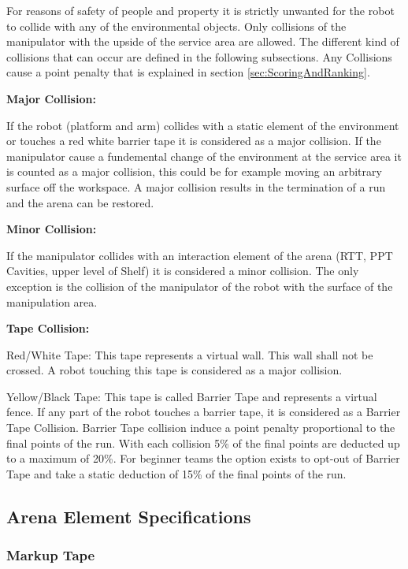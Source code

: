 For reasons of safety of people and property it is strictly unwanted for the robot to collide
with any of the environmental objects. Only collisions of the manipulator with the upside of
the service area are allowed. The different kind of collisions that can occur are defined in the
following subsections. Any Collisions cause a point penalty that is explained in section \ref{sec:ScoringAndRanking}. 

\textbf{Major Collision:}

If the robot (platform and arm) collides with a static element of the environment or touches a red white barrier tape it is considered as a major collision. If the manipulator cause a fundemental change of the environment at the service area it is counted as a major collision, this could be for example moving an arbitrary surface off the workspace. A major collision results in the termination of a run and the arena can be restored. 

\textbf{Minor Collision:}

If the manipulator collides with an interaction element of the arena (RTT, PPT Cavities, upper level
of Shelf) it is considered a minor collision. The only exception is the collision of the manipulator
of the robot with the surface of the manipulation area.

\textbf{Tape Collision:}

Red/White Tape: 
This tape represents a virtual wall. This wall shall not be crossed. A robot touching this tape is considered as a major collision.

Yellow/Black Tape: 
This tape is called Barrier Tape and represents a virtual fence. If any
part of the robot touches a barrier tape, it is considered as a Barrier Tape Collision. Barrier
Tape collision induce a point penalty proportional to the final points of the run. With
each collision 5\% of the final points are deducted up to a maximum of 20\%. For beginner
teams the option exists to opt-out of Barrier Tape and take a static deduction of 15\% of
the final points of the run.



\subsection{Arena Element Specifications}
\label{subsec: Arena Element Specifications}

\subsubsection{Markup Tape}


